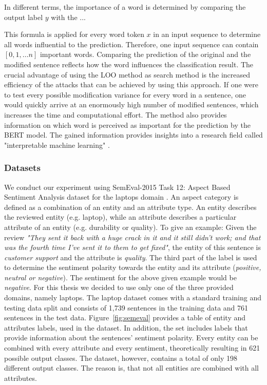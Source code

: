 In different terms, the importance of a word is determined by comparing the output label $y$ with the ...

This formula is applied for every word token $x$ in an input sequence to determine all words influential to the prediction. Therefore, one input sequence can contain $[0,1, \dots n]$ important words. 
Comparing the prediction of the original and the modified sentence reflects how the word influences the classification result. 
The crucial advantage of using the LOO method as search method is the increased efficiency of the attacks that can be achieved by using this approach. If one were to test every possible modification variance for every word in a sentence, one would quickly arrive at an enormously high number of modified sentences, which increases the time and computational effort. The method also provides information on which word is perceived as important for the prediction by the BERT model. The gained information provides insights into a research field called "interpretable machine learning" \cite{doshi2017towards}.

\subsubsection{Datasets} 
\label{sec:datasets}
We conduct our experiment using SemEval-2015 Task 12: Aspect Based Sentiment Analysis dataset for the laptops domain \cite{pontiki2015semeval}. An aspect category is defined as a combination of an entity and an attribute type. An entity describes the reviewed entity (e.g. laptop), while an attribute describes a particular attribute of an entity (e.g. durability or quality).
To give an example:
Given the review \textit{"They sent it back with a huge crack in it and it still didn't work; and that was the fourth time I've sent it to them to get fixed"}, the entity of this sentence is \textit{customer support} and the attribute is \textit{quality}. The third part of the label is used to determine the sentiment polarity towards the entity and its attribute (\textit{positive, neutral or negative}). The sentiment for the above given example would be \textit{negative}.
For this thesis we decided to use only one of the three provided domains, namely laptops. The laptop dataset comes with a standard training and testing data split and consists of 1,739 sentences in the training data and 761 sentences in the test data. Figure~\ref{fig:semeval} provides a table of entity and attributes labels, used in the dataset. In addition, the set includes labels that provide information about the sentences' sentiment polarity. Every entity can be combined with every attribute and every sentiment, theoretically resulting in 621 possible output classes. The dataset, however, contains a total of only 198 different output classes. The reason is, that not all entities are combined with all attributes.

